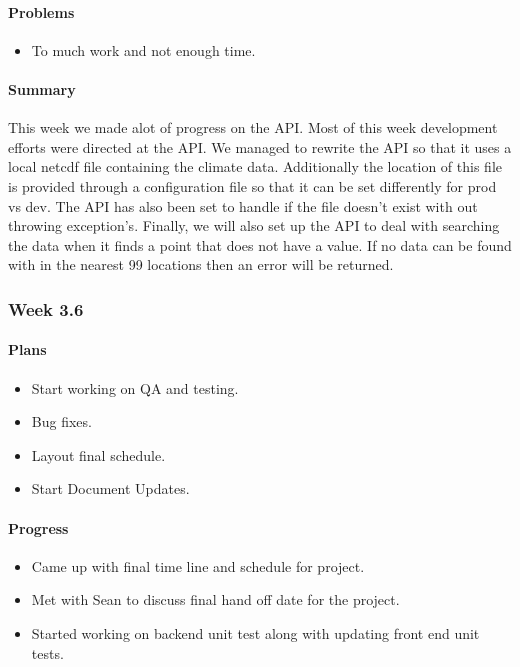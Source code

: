 \documentclass[onecolumn, draftclsnofoot,10pt, compsoc]{article}
\begin{document}
		    \paragraph{Problems} \hfill \break
		        \begin{itemize}
		            \item To much work and not enough time.\\
		        \end{itemize}
		    \paragraph{Summary} \hfill \break
		        This week we made alot of progress on the API. Most of this week development efforts were directed at the API. We managed to rewrite the API so that it uses a local netcdf file containing the climate data. Additionally the location of this file is provided through a configuration file so that it can be set differently for prod vs dev. The API has also been set to handle if the file doesn't exist with out throwing exception's. Finally, we will also set up the API to deal with searching the data when it finds a point that does not have a value. If no data can be found with in the nearest 99 locations then an error will be returned.\\
		\subsubsection{Week 3.6}
		    \paragraph{Plans} \hfill \break
		        \begin{itemize}
		            \item Start working on QA and testing.
		            \item Bug fixes.
		            \item Layout final schedule.
		            \item Start Document Updates.
		        \end{itemize}
		    \paragraph{Progress} \hfill \break
		        \begin{itemize}
		            \item Came up with final time line and schedule for project.
		            \item Met with Sean to discuss final hand off date for the project.\\
		            \item Started working on backend unit test along with updating front end unit tests.\\
		        \end{itemize}
\end{document}
